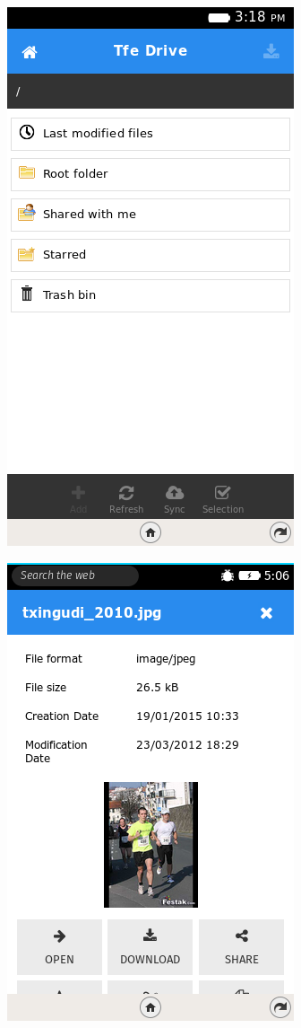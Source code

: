 \documentclass{beamer}
\begin{document}
\begin{frame}
\begin{center}
\includegraphics[scale=0.5] {./images/TFEDrive04.png} 
\end{center}
\end{frame}

\begin{frame}
\begin{center}
\includegraphics[scale=0.5] {./images/TFEDrive05.png} 
\end{center}
\end{frame}
\end{document}

